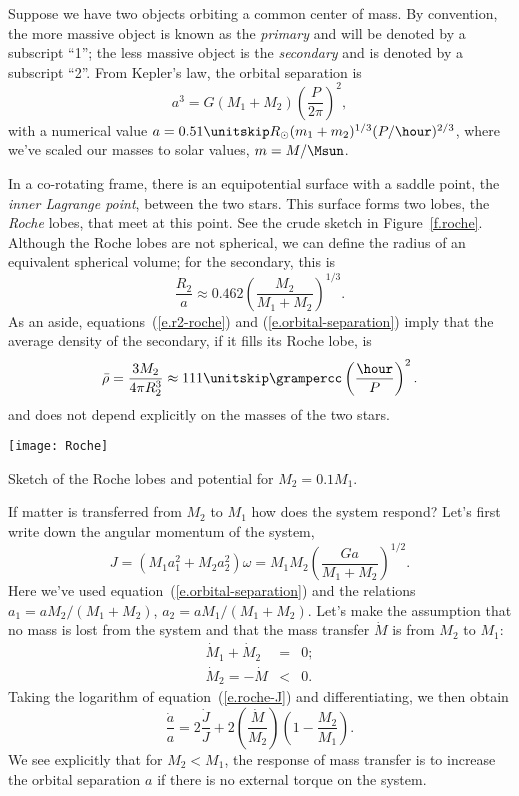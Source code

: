 Suppose we have two objects orbiting a common center of mass.  By convention, the more massive object is known as the \emph{primary} and will be denoted by a subscript ``1''; the less massive object is the \emph{secondary} and is denoted by a subscript ``2''.  From Kepler's law, the orbital separation is
\begin{equation}\label{e.orbital-separation}
	a^{3} = G(M_{1}+M_{2}) \left(\frac{P}{2\pi}\right)^{2}, 
\end{equation}
with a numerical value $a = 0.51\nsp R_{\sun} (m_{1}+m_{2})^{1/3} (P/\hour)^{2/3}$, where we've scaled our masses to solar values, $m = M/\Msun$.

In a co-rotating frame, there is an equipotential surface with a saddle point, the \emph{inner Lagrange point}, between the two stars.  This surface forms two lobes, the \emph{Roche} lobes, that meet at this point. See the crude sketch in Figure~\ref{f.roche}.
Although the Roche lobes are not spherical, we can define the radius of an equivalent spherical volume; for the secondary, this is
\begin{equation}\label{e.r2-roche}
\frac{R_{2}}{a} \approx 0.462 \left(\frac{M_{2}}{M_{1} + M_{2}}\right)^{1/3}.
\end{equation}
As an aside, equations~(\ref{e.r2-roche}) and (\ref{e.orbital-separation}) imply that the average density of the secondary, if it fills its Roche lobe, is
\[
	\bar{\rho} = \frac{3M_{2}}{4\pi R_{2}^{3}} \approx 111\nsp\grampercc\left(\frac{\hour}{P}\right)^{2}.
\]
and does not depend explicitly on the masses of the two stars.

\begin{marginfigure}
\texttt{[image: Roche]}
\caption[Schematic of Roche lobes]{\label{f.roche} Sketch of the Roche lobes and potential for $M_{2} = 0.1 M_{1}$.}
\end{marginfigure}

If matter is transferred from $M_{2}$ to $M_{1}$ how does the system respond?  Let's first write down the angular momentum of the system,
\begin{equation}\label{e.roche-J}
J = (M_{1}a_{1}^{2} + M_{2}a_{2}^{2}) \omega = M_{1}M_{2}\left(\frac{Ga}{M_{1}+M_{2}}\right)^{1/2}.
\end{equation}
Here we've used equation~(\ref{e.orbital-separation}) and the relations $a_{1} = aM_{2}/(M_{1}+M_{2})$, $a_{2} = aM_{1}/(M_{1}+M_{2})$.  Let's make the assumption that no mass is lost from the system and that the mass transfer $\dot{M}$ is from $M_{2}$ to $M_{1}$:
\begin{eqnarray*}
\dot{M}_{1} + \dot{M}_{2} &=& 0;\\
\dot{M}_{2} = -\dot{M} &<& 0.
\end{eqnarray*}
Taking the logarithm of equation~(\ref{e.roche-J}) and differentiating, we then obtain
\begin{equation}\label{e.roche-adot}
\frac{\dot{a}}{a} = 2\frac{\dot{J}}{J}  + 2 \left(\frac{\dot{M}}{M_{2}}\right) \left(1-\frac{M_{2}}{M_{1}}\right).
\end{equation}
We see explicitly that for $M_{2}< M_{1}$, the response of mass transfer is to increase the orbital separation $a$ if there is no external torque on the system.


